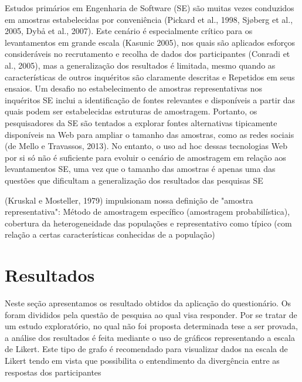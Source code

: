 Estudos primários em Engenharia de Software (SE) são muitas vezes conduzidos em
amostras estabelecidas por conveniência (Pickard et al., 1998, Sjøberg et al.,
2005, Dybå et al., 2007). Este cenário é especialmente crítico para os
levantamentos em grande escala (Kasunic 2005), nos quais são aplicados esforços
consideráveis no recrutamento e recolha de dados dos participantes (Conradi et
al., 2005), mas a generalização dos resultados é limitada, mesmo quando as
características de outros inquéritos são claramente descritas e Repetidos em
seus ensaios.
Um desafio no estabelecimento de amostras representativas nos inquéritos SE
inclui a identificação de fontes relevantes e disponíveis a partir das quais
podem ser estabelecidas estruturas de amostragem. Portanto, os pesquisadores da
SE são tentados a explorar fontes alternativas tipicamente disponíveis na Web
para ampliar o tamanho das amostras, como as redes sociais (de Mello e
Travassos, 2013). No entanto, o uso ad hoc dessas tecnologias Web por si só não
é suficiente para evoluir o cenário de amostragem em relação aos levantamentos
SE, uma vez que o tamanho das amostras é apenas uma das questões que dificultam
a generalização dos resultados das pesquisas SE

(Kruskal e Mosteller, 1979) impulsionam nossa definição de "amostra
representativa": Método de amostragem específico (amostragem probabilística),
cobertura da heterogeneidade das populações e representativo como típico (com
relação a certas características conhecidas de a população)












\section{Resultados}
\label{sec:analise_dados}

Neste seção apresentamos os resultado obtidos da aplicação do questionário. Os
foram divididos pela questão de pesquisa ao qual visa responder. Por se tratar
de um estudo exploratório, no qual não foi proposta determinada tese a ser
provada, a análise dos resultados é feita mediante o uso de gráficos
representando a escala de Likert. Este tipo de grafo é recomendado para
visualizar dados na escala de Likert tendo em vista que possibilita o
entendimento da divergência entre as respostas dos
participantes~\cite{robbins2011plotting}

